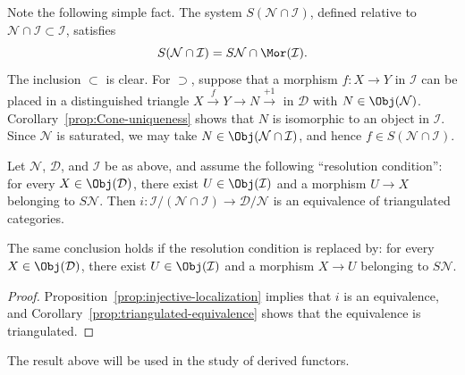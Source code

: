 Note the following simple fact. The system
$S(\mathcal{N} \cap \mathcal{I})$, defined relative to
$\mathcal{N} \cap \mathcal{I} \subset \mathcal{I}$, satisfies
\begin{equation}\label{eqn:S-N-D}
	S(\mathcal{N} \cap \mathcal{I}) = S\mathcal{N} \cap \Mor(\mathcal{I}).
\end{equation}
The inclusion $\subset$ is clear. For $\supset$, suppose that a morphism
$f: X \to Y$ in $\mathcal{I}$ can be placed in a distinguished triangle
$X \xrightarrow{f} Y \to N \xrightarrow{+1}$ in $\mathcal{D}$ with
$N \in \Obj(\mathcal{N})$. Corollary~\ref{prop:Cone-uniqueness} shows that
$N$ is isomorphic to an object in $\mathcal{I}$. Since $\mathcal{N}$ is
saturated, we may take $N \in \Obj(\mathcal{N} \cap \mathcal{I})$, and hence
$f \in S(\mathcal{N} \cap \mathcal{I})$.

\begin{proposition}\label{prop:triangulated-i-equiv}
	Let $\mathcal{N}$, $\mathcal{D}$, and $\mathcal{I}$ be as above, and
	assume the following “resolution condition”: for every
	$X \in \Obj(\mathcal{D})$, there exist $U \in \Obj(\mathcal{I})$ and a
	morphism $U \to X$ belonging to $S\mathcal{N}$. Then
	$i: \mathcal{I}/(\mathcal{N} \cap \mathcal{I})
	\to \mathcal{D}/\mathcal{N}$ is an equivalence of triangulated
	categories.

	The same conclusion holds if the resolution condition is replaced by:
	for every $X \in \Obj(\mathcal{D})$, there exist
	$U \in \Obj(\mathcal{I})$ and a morphism $X \to U$ belonging to
	$S\mathcal{N}$.
\end{proposition}

\begin{proof}
	Proposition~\ref{prop:injective-localization} implies that $i$ is an
	equivalence, and Corollary~\ref{prop:triangulated-equivalence} shows that
	the equivalence is triangulated.
\end{proof}

The result above will be used in the study of derived functors.
